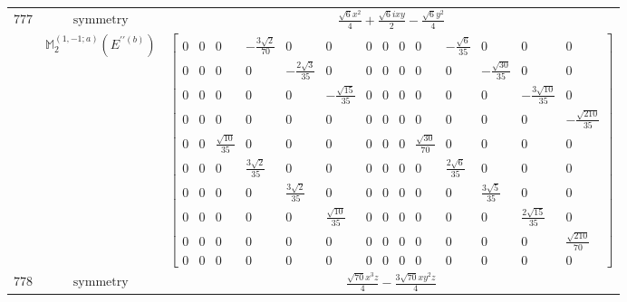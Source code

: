 \documentclass[fleqn,8pt,landscape]{jsarticle}
\begin{document}
\begin{longtable}{ccc}
$ 777 $ & $ \text{symmetry} $ & $ \frac{\sqrt{6} x^{2}}{4} + \frac{\sqrt{6} i x y}{2} - \frac{\sqrt{6} y^{2}}{4} $ \\
$  $ & $ \mathbb{M}_{2}^{(1,-1;a)}(E^{\prime\prime(b)}) $ & $ \begin{bmatrix} 0 & 0 & 0 & - \frac{3 \sqrt{2}}{70} & 0 & 0 & 0 & 0 & 0 & 0 & - \frac{\sqrt{6}}{35} & 0 & 0 & 0 \\ 0 & 0 & 0 & 0 & - \frac{2 \sqrt{3}}{35} & 0 & 0 & 0 & 0 & 0 & 0 & - \frac{\sqrt{30}}{35} & 0 & 0 \\ 0 & 0 & 0 & 0 & 0 & - \frac{\sqrt{15}}{35} & 0 & 0 & 0 & 0 & 0 & 0 & - \frac{3 \sqrt{10}}{35} & 0 \\ 0 & 0 & 0 & 0 & 0 & 0 & 0 & 0 & 0 & 0 & 0 & 0 & 0 & - \frac{\sqrt{210}}{35} \\ 0 & 0 & \frac{\sqrt{10}}{35} & 0 & 0 & 0 & 0 & 0 & 0 & \frac{\sqrt{30}}{70} & 0 & 0 & 0 & 0 \\ 0 & 0 & 0 & \frac{3 \sqrt{2}}{35} & 0 & 0 & 0 & 0 & 0 & 0 & \frac{2 \sqrt{6}}{35} & 0 & 0 & 0 \\ 0 & 0 & 0 & 0 & \frac{3 \sqrt{2}}{35} & 0 & 0 & 0 & 0 & 0 & 0 & \frac{3 \sqrt{5}}{35} & 0 & 0 \\ 0 & 0 & 0 & 0 & 0 & \frac{\sqrt{10}}{35} & 0 & 0 & 0 & 0 & 0 & 0 & \frac{2 \sqrt{15}}{35} & 0 \\ 0 & 0 & 0 & 0 & 0 & 0 & 0 & 0 & 0 & 0 & 0 & 0 & 0 & \frac{\sqrt{210}}{70} \\ 0 & 0 & 0 & 0 & 0 & 0 & 0 & 0 & 0 & 0 & 0 & 0 & 0 & 0 \end{bmatrix} $ \\ \hline
$ 778 $ & $ \text{symmetry} $ & $ \frac{\sqrt{70} x^{3} z}{4} - \frac{3 \sqrt{70} x y^{2} z}{4} $ \\

\end{longtable}
\end{document}
